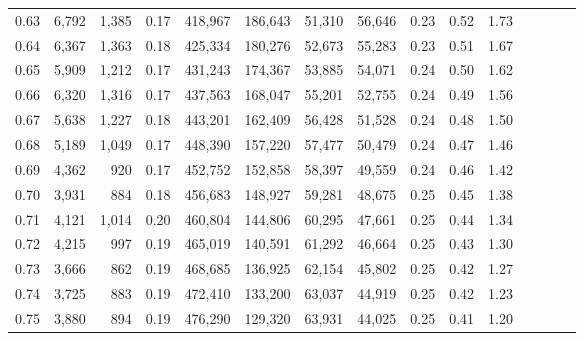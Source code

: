\begin{tabular}{rrrcrrrrrrrrrrr}
0.63 &   6,792 &   1,385 &                                       0.17 &  418,967 &  186,643 &   51,310 &   56,646 &  0.23 &  0.52 &                         1.73 \\
0.64 &   6,367 &   1,363 &                                       0.18 &  425,334 &  180,276 &   52,673 &   55,283 &  0.23 &  0.51 &                         1.67 \\
0.65 &   5,909 &   1,212 &                                       0.17 &  431,243 &  174,367 &   53,885 &   54,071 &  0.24 &  0.50 &                         1.62 \\
0.66 &   6,320 &   1,316 &                                       0.17 &  437,563 &  168,047 &   55,201 &   52,755 &  0.24 &  0.49 &                         1.56 \\
0.67 &   5,638 &   1,227 &                                       0.18 &  443,201 &  162,409 &   56,428 &   51,528 &  0.24 &  0.48 &                         1.50 \\
0.68 &   5,189 &   1,049 &                                       0.17 &  448,390 &  157,220 &   57,477 &   50,479 &  0.24 &  0.47 &                         1.46 \\
0.69 &   4,362 &     920 &                                       0.17 &  452,752 &  152,858 &   58,397 &   49,559 &  0.24 &  0.46 &                         1.42 \\
0.70 &   3,931 &     884 &                                       0.18 &  456,683 &  148,927 &   59,281 &   48,675 &  0.25 &  0.45 &                         1.38 \\
0.71 &   4,121 &   1,014 &                                       0.20 &  460,804 &  144,806 &   60,295 &   47,661 &  0.25 &  0.44 &                         1.34 \\
0.72 &   4,215 &     997 &                                       0.19 &  465,019 &  140,591 &   61,292 &   46,664 &  0.25 &  0.43 &                         1.30 \\
0.73 &   3,666 &     862 &                                       0.19 &  468,685 &  136,925 &   62,154 &   45,802 &  0.25 &  0.42 &                         1.27 \\
0.74 &   3,725 &     883 &                                       0.19 &  472,410 &  133,200 &   63,037 &   44,919 &  0.25 &  0.42 &                         1.23 \\
0.75 &   3,880 &     894 &                                       0.19 &  476,290 &  129,320 &   63,931 &   44,025 &  0.25 &  0.41 &                         1.20 \\

\end{tabular}

